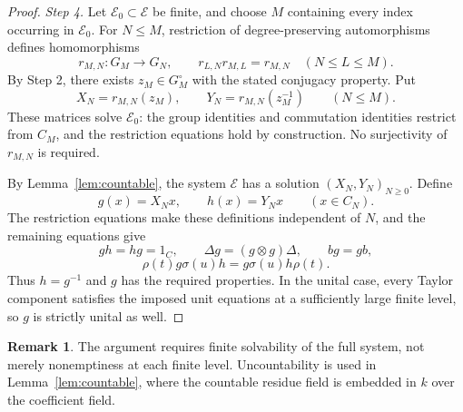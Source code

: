 \documentclass[12pt,a4paper,english,reqno]{amsart}
\theoremstyle{plain}
\theoremstyle{definition}
\newtheorem{rmk}[thm]{Remark}
\numberwithin{equation}{section}
\newcommand{\lemref}[1]{Lemma~\ref{#1}}
\def\ro{\rho}
\def\si{\sigma}
\def\De{\Delta}
\def\ox{\otimes}
\begin{document}
\begin{proof}
\medskip\noindent\emph{Step 4.}
Let $\mathcal E_0\subset\mathcal E$ be finite, and choose $M$ containing every index occurring in $\mathcal E_0$. For $N\le M$, restriction of degree-preserving automorphisms defines homomorphisms
\[
 r_{M,N}:G_M\longrightarrow G_N,\qquad
 r_{L,N}r_{M,L}=r_{M,N}\quad(N\le L\le M).
\]
By Step 2, there exists $z_M\in G_M^\circ$ with the stated conjugacy property. Put
\[
 X_N=r_{M,N}(z_M),\qquad
 Y_N=r_{M,N}(z_M^{-1})\qquad(N\le M).
\]
These matrices solve $\mathcal E_0$: the group identities and commutation identities restrict from $C_M$, and the restriction equations hold by construction. No surjectivity of $r_{M,N}$ is required.

By \lemref{lem:countable}, the system $\mathcal E$ has a solution $(X_N,Y_N)_{N\ge0}$. Define
\[
 g(x)=X_Nx,\qquad h(x)=Y_Nx\qquad(x\in C_N).
\]
The restriction equations make these definitions independent of $N$, and the remaining equations give
\[
 gh=hg=1_C,\qquad
 \De g=(g\ox g)\De,\qquad bg=gb,
\]
\[
 \ro(t)g\si(u)h=g\si(u)h\ro(t).
\]
Thus $h=g^{-1}$ and $g$ has the required properties. In the unital case, every Taylor component satisfies the imposed unit equations at a sufficiently large finite level, so $g$ is strictly unital as well.
\end{proof}

\begin{rmk}\label{rem:field}
The argument requires finite solvability of the full system, not merely nonemptiness at each finite level. Uncountability is used in \lemref{lem:countable}, where the countable residue field is embedded in $k$ over the coefficient field.
\end{rmk}
\end{document}
